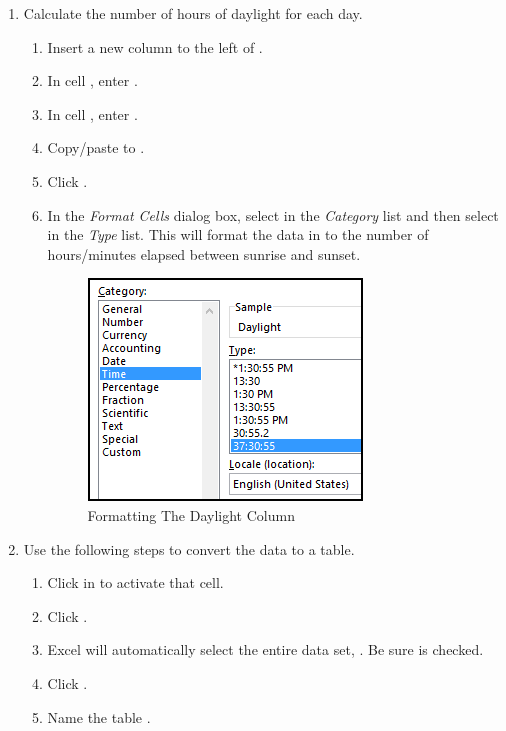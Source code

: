\begin{enumbox}
	\begin{enumerate}
		\item Calculate the number of hours of daylight for each day.
		
		\begin{enumerate}
			\item Insert a new column to the left of .
			\item In cell , enter .
			\item In cell , enter .
			\item Copy/paste  to .
			\item Click . 
			\item In the \textit{Format Cells} dialog box, select  in the \textit{Category} list and then select  in the \textit{Type} list. This will format the data in  to the number of hours/minutes elapsed between sunrise and sunset.
			
			\begin{figure}[H]
				\centering
				\includegraphics[width=\maxwidth{.75\linewidth}]{gfx/ch09_fig80}
				\caption{Formatting The Daylight Column}
				\label{09:fig80}
			\end{figure}
			
			
		\end{enumerate}
		
		\item Use the following steps to convert the data to a table.
		
		\begin{enumerate}
			\item Click in  to activate that cell.
			\item Click .
			\item Excel will automatically select the entire data set, . Be sure  is checked.
			\item Click .
			\item Name the table .
		\end{enumerate}
		

\end{enumerate}
\end{enumbox}
